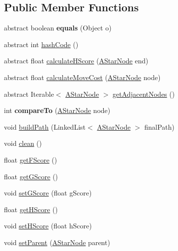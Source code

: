 \subsection*{Public Member Functions}
\begin{DoxyCompactItemize}
\item 
\hypertarget{classa__star_1_1_a_star_node_abf6a3d45b4c9304781df2971f24c72fc}{abstract boolean {\bfseries equals} (Object o)}\label{classa__star_1_1_a_star_node_abf6a3d45b4c9304781df2971f24c72fc}

\item 
abstract int \hyperlink{classa__star_1_1_a_star_node_a75c98195daaea78b4bf7c5c058cd792f}{hash\-Code} ()
\item 
abstract float \hyperlink{classa__star_1_1_a_star_node_a64cdac7457076efaf65485371d78b80e}{calculate\-H\-Score} (\hyperlink{classa__star_1_1_a_star_node}{A\-Star\-Node} end)
\item 
abstract float \hyperlink{classa__star_1_1_a_star_node_a2b653c71bec99f438a8c9037271bc98a}{calculate\-Move\-Cost} (\hyperlink{classa__star_1_1_a_star_node}{A\-Star\-Node} node)
\item 
abstract Iterable$<$ \hyperlink{classa__star_1_1_a_star_node}{A\-Star\-Node} $>$ \hyperlink{classa__star_1_1_a_star_node_a0472314423f1ff1956f0436f41c77bb6}{get\-Adjacent\-Nodes} ()
\item 
\hypertarget{classa__star_1_1_a_star_node_aa1a2db3a747ac0a2676b20984c246d73}{int {\bfseries compare\-To} (\hyperlink{classa__star_1_1_a_star_node}{A\-Star\-Node} node)}\label{classa__star_1_1_a_star_node_aa1a2db3a747ac0a2676b20984c246d73}

\item 
void \hyperlink{classa__star_1_1_a_star_node_a169258256c2ce25e28d7f6c4381869f5}{build\-Path} (Linked\-List$<$ \hyperlink{classa__star_1_1_a_star_node}{A\-Star\-Node} $>$ final\-Path)
\item 
void \hyperlink{classa__star_1_1_a_star_node_adceb6629155eb3ca1f779b9b179b2d2b}{clean} ()
\item 
float \hyperlink{classa__star_1_1_a_star_node_adcf900db191a0ecdf58d0fe1a84ae345}{get\-F\-Score} ()
\item 
float \hyperlink{classa__star_1_1_a_star_node_a285b5d342aee7592cf089218af146d7c}{get\-G\-Score} ()
\item 
void \hyperlink{classa__star_1_1_a_star_node_aedfb508aac1b1aec7626dcacfc87fa54}{set\-G\-Score} (float g\-Score)
\item 
float \hyperlink{classa__star_1_1_a_star_node_ae7d11e89196028b8b664aaac6296c9ee}{get\-H\-Score} ()
\item 
void \hyperlink{classa__star_1_1_a_star_node_a19627a0d4ac73deff6147cb5162fd4d3}{set\-H\-Score} (float h\-Score)
\item 
void \hyperlink{classa__star_1_1_a_star_node_aa3ce3d0f657b61e934e1b1b0a1cf3707}{set\-Parent} (\hyperlink{classa__star_1_1_a_star_node}{A\-Star\-Node} parent)
\end{DoxyCompactItemize}


